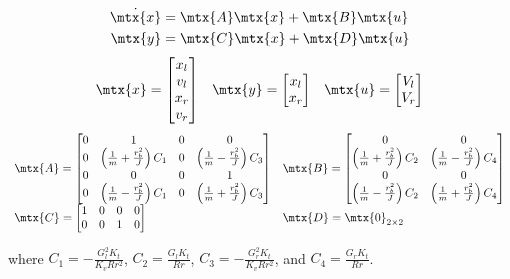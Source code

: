 \begin{theorem}
  \begin{align*}
    \dot{\mtx{x}} &= \mtx{A} \mtx{x} + \mtx{B} \mtx{u} \\
    \mtx{y} &= \mtx{C} \mtx{x} + \mtx{D} \mtx{u}
  \end{align*}
  \begin{equation*}
    \begin{array}{ccc}
      \mtx{x} =
      \begin{bmatrix}
        x_l \\
        v_l \\
        x_r \\
        v_r
      \end{bmatrix} &
      \mtx{y} =
      \begin{bmatrix}
        x_l \\
        x_r
      \end{bmatrix} &
      \mtx{u} =
      \begin{bmatrix}
        V_l \\
        V_r
      \end{bmatrix}
    \end{array}
  \end{equation*}
  \begin{equation}
    \label{eq:diff_drive_ss_model}
    \begin{array}{ll}
      \mtx{A} =
      \begin{bmatrix}
        0 & 1 & 0 & 0 \\
        0 & \left(\frac{1}{m} + \frac{r_b^2}{J}\right) C_1 & 0 & \left(\frac{1}{m} - \frac{r_b^2}{J}\right) C_3 \\
        0 & 0 & 0 & 1 \\
        0 & \left(\frac{1}{m} - \frac{r_b^2}{J}\right) C_1 & 0 & \left(\frac{1}{m} + \frac{r_b^2}{J}\right) C_3
      \end{bmatrix} &
      \mtx{B} =
      \begin{bmatrix}
        0 & 0 \\
        \left(\frac{1}{m} + \frac{r_b^2}{J}\right) C_2 & \left(\frac{1}{m} - \frac{r_b^2}{J}\right) C_4 \\
        0 & 0 \\
        \left(\frac{1}{m} - \frac{r_b^2}{J}\right) C_2 & \left(\frac{1}{m} + \frac{r_b^2}{J}\right) C_4
      \end{bmatrix} \\
      \mtx{C} =
      \begin{bmatrix}
        1 & 0 & 0 & 0 \\
        0 & 0 & 1 & 0 \\
      \end{bmatrix} &
      \mtx{D} = \mtx{0}_{2 \times 2}
    \end{array}
  \end{equation}

  where $C_1 = -\frac{G_l^2 K_t}{K_v R r^2}$, $C_2 = \frac{G_l K_t}{Rr}$,
  $C_3 = -\frac{G_r^2 K_t}{K_v R r^2}$, and $C_4 = \frac{G_r K_t}{Rr}$.
\end{theorem}

